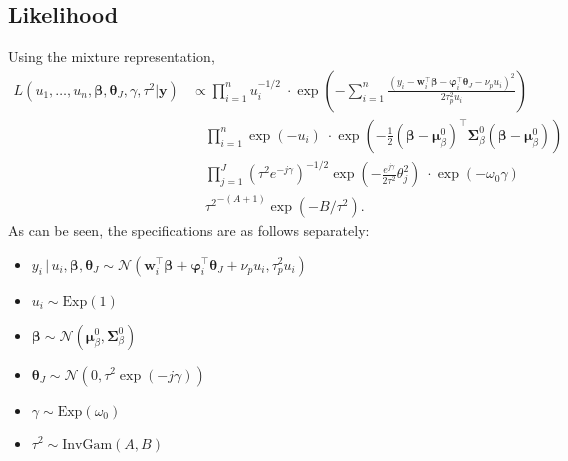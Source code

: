 \documentclass[12pt]{article}
\newcommand{\bs}{\boldsymbol}
\begin{document}
\subsection{Likelihood}
Using the mixture representation,
\begin{align}
  L\left(u_{1}, \ldots , u_{n}, \bs{\beta}, \bs{\theta}_{J}, \gamma, \tau^{2}|\mathbf{y}\right) &\propto \prod_{i=1}^{n}u_{i}^{-1/2}\;\cdot \exp\left(-\sum_{i=1}^{n}\frac{\left(y_{i}-\bs{w}_{i}^{\top}\bs{\beta}-\bs{\varphi}_{i}^{\top}\bs{\theta}_{J}-\nu_{p}u_{i}\right)^{2}}{2\tau_{p}^{2}u_{i}} \right)\\
  &\quad \prod_{i=1}^{n}\exp\left(-u_{i}\right)\;\cdot\exp\left(-\frac{1}{2}\left(\bs{\beta}-\bs{\mu}_{\beta}^{0}\right)^{\top}\bs{\Sigma}_{\beta}^{0}\left(\bs{\beta}-\bs{\mu}_{\beta}^{0}\right)\right)\\
  &\quad \prod_{j=1}^{J}\left(\tau^{2}e^{-j\gamma}\right)^{-1/2}\exp\left(-\frac{e^{j\gamma}}{2\tau^{2}}\theta_{j}^{2}\right)\;\cdot \exp\left(-\omega_{0}\gamma\right)\\
  &\quad {\tau^{2}}^{-\left(A+1\right)}\exp\left(-B/\tau^{2}\right).
\end{align}
As can be seen, the specifications are as follows separately:
\begin{itemize}
  \item $y_{i}\,|\,u_{i}, \bs{\beta},\bs{\theta}_{J} \sim \mathcal{N}\left(\bs{w}_{i}^{\top}\bs{\beta}+\bs{\varphi}_{i}^{\top}\bs{\theta}_{J}+\nu_{p}u_{i}, \tau_{p}^{2}u_{i}\right)$
  \item $u_{i}\sim \mathrm{Exp}\left(1\right)$
  \item $\bs{\beta} \sim \mathcal{N}\left(\bs{\mu}_{\beta}^{0}, \bs{\Sigma}_{\beta}^{0}\right)$
  \item $\bs{\theta}_{J}\sim \mathcal{N}\left(0, \tau^{2}\exp\left(-j\gamma \right)\right)$
  \item $\gamma \sim \mathrm{Exp}\left(\omega_{0}\right)$
  \item $\tau^{2} \sim \mathrm{InvGam}\left(A,B\right)$
\end{itemize}
\end{document}
